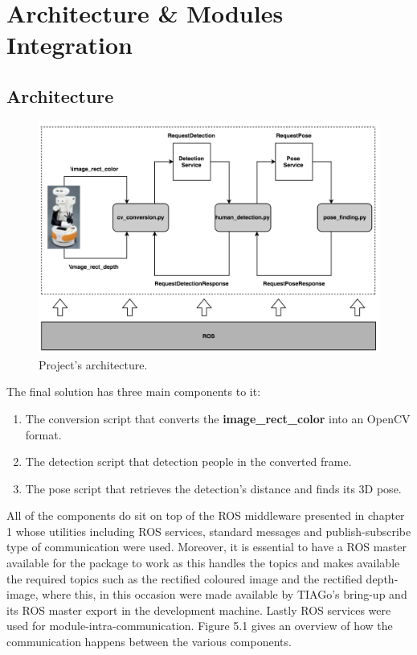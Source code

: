 \chapter{Architecture \& Modules Integration}
\label{chapter5}

\section{Architecture}

\begin{figure}[!htbp]
\begin{center}
\includegraphics[width=\linewidth]{images/chapter6_architecture.png}
\end{center}
\caption{Project's architecture.}
\label{fig:architecture}
\end{figure}

The final solution has three main components to it:

\begin{enumerate}
	\item The conversion script that converts the \textbf{image\_rect\_color} into an OpenCV format.
    \item The detection script that detection people in the converted frame.
    \item The pose script that retrieves the detection's distance and finds its 3D pose.
\end{enumerate}

All of the components do sit on top of the ROS middleware presented in chapter 1 whose utilities including ROS services, standard messages and publish-subscribe type of communication were used. Moreover, it is essential to have a ROS master available for the package to work as this handles the topics and makes available the required topics such as the rectified coloured image and the rectified depth-image, where this, in this occasion were made available by TIAGo's bring-up and its ROS master export in the development machine. Lastly ROS services were used for module-intra-communication. Figure 5.1 gives an overview of how the communication happens between the various components.

